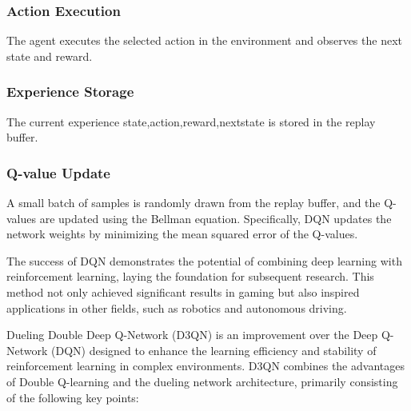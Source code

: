 \documentclass[journal]{IEEEtran}
\begin{document}
\subsubsection{Action Execution}The agent executes the selected action in the environment and observes the next state and reward.

\subsubsection{Experience Storage}The current experience state,action,reward,nextstate is stored in the replay buffer.

\subsubsection{Q-value Update}A small batch of samples is randomly drawn from the replay buffer, and the Q-values are updated using the Bellman equation. Specifically, DQN updates the network weights by minimizing the mean squared error of the Q-values.

The success of DQN demonstrates the potential of combining deep learning with reinforcement learning, laying the foundation for subsequent research. This method not only achieved significant results in gaming but also inspired applications in other fields, such as robotics and autonomous driving.

Dueling Double Deep Q-Network (D3QN) is an improvement over the Deep Q-Network (DQN) designed to enhance the learning efficiency and stability of reinforcement learning in complex environments. D3QN combines the advantages of Double Q-learning and the dueling network architecture, primarily consisting of the following key points:
\end{document}
